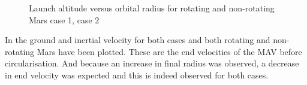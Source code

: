 \begin{figure}[H]
\centering
{} 
\caption{Launch altitude versus orbital radius for rotating and non-rotating Mars \protect{} case 1,  \protect{} case 2 } 
\label{fig:launchAltitudeVsRadiusCase1combined} 
\end{figure} 

\noindent 
In  the ground and inertial velocity for both cases and both rotating and non-rotating Mars have been plotted. These are the end velocities of the \ac{MAV} before circularisation. And because an increase in final radius was observed, a decrease in end velocity was expected and this is indeed observed for both cases. 


